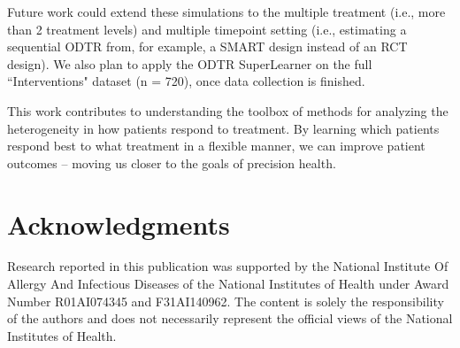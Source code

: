 \documentclass[a4paper,12pt]{article}
\begin{document}
Future work could extend these simulations to the multiple treatment (i.e., more than 2 treatment levels) \citep{coyle2017computational} and multiple timepoint setting (i.e., estimating a sequential ODTR from, for example, a SMART design \citep{lei2012smart, kosorok2015adaptive, almirall2014introduction} instead of an RCT design). We also plan to apply the ODTR SuperLearner on the full ``Interventions" dataset (n = 720), once data collection is finished.%



This work contributes to understanding the toolbox of methods for analyzing the heterogeneity in how patients respond to treatment. By learning which patients respond best to what treatment in a flexible manner, we can improve patient outcomes -- moving us closer to the goals of precision health.

\section{Acknowledgments}

Research reported in this publication was supported by the National Institute Of Allergy And Infectious Diseases of the National Institutes of Health under Award Number R01AI074345 and F31AI140962. The content is solely the responsibility of the authors and does not necessarily represent the official views of the National Institutes of Health.
\end{document}
